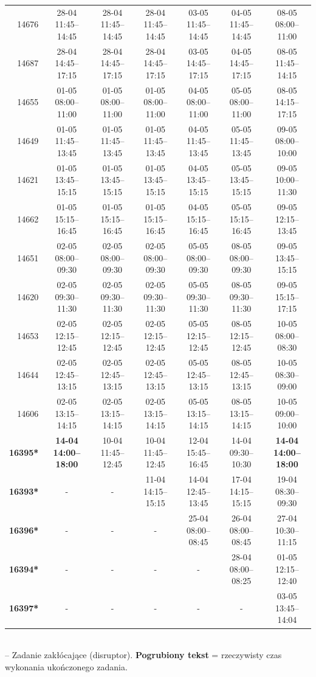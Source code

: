 \begin{table}[htbp]
\begin{tabular}{|r|c|c|c|c|c|c|}
14676 & 28-04 11:45--14:45 & 28-04 11:45--14:45 & 28-04 11:45--14:45 & 03-05 11:45--14:45 & 04-05 11:45--14:45 & 08-05 08:00--11:00 \\ 
14687 & 28-04 14:45--17:15 & 28-04 14:45--17:15 & 28-04 14:45--17:15 & 03-05 14:45--17:15 & 04-05 14:45--17:15 & 08-05 11:45--14:15 \\ 
14655 & 01-05 08:00--11:00 & 01-05 08:00--11:00 & 01-05 08:00--11:00 & 04-05 08:00--11:00 & 05-05 08:00--11:00 & 08-05 14:15--17:15 \\ 
14649 & 01-05 11:45--13:45 & 01-05 11:45--13:45 & 01-05 11:45--13:45 & 04-05 11:45--13:45 & 05-05 11:45--13:45 & 09-05 08:00--10:00 \\ 
14621 & 01-05 13:45--15:15 & 01-05 13:45--15:15 & 01-05 13:45--15:15 & 04-05 13:45--15:15 & 05-05 13:45--15:15 & 09-05 10:00--11:30 \\ 
14662 & 01-05 15:15--16:45 & 01-05 15:15--16:45 & 01-05 15:15--16:45 & 04-05 15:15--16:45 & 05-05 15:15--16:45 & 09-05 12:15--13:45 \\ 
14651 & 02-05 08:00--09:30 & 02-05 08:00--09:30 & 02-05 08:00--09:30 & 05-05 08:00--09:30 & 08-05 08:00--09:30 & 09-05 13:45--15:15 \\ 
14620 & 02-05 09:30--11:30 & 02-05 09:30--11:30 & 02-05 09:30--11:30 & 05-05 09:30--11:30 & 08-05 09:30--11:30 & 09-05 15:15--17:15 \\ 
14653 & 02-05 12:15--12:45 & 02-05 12:15--12:45 & 02-05 12:15--12:45 & 05-05 12:15--12:45 & 08-05 12:15--12:45 & 10-05 08:00--08:30 \\ 
14644 & 02-05 12:45--13:15 & 02-05 12:45--13:15 & 02-05 12:45--13:15 & 05-05 12:45--13:15 & 08-05 12:45--13:15 & 10-05 08:30--09:00 \\ 
14606 & 02-05 13:15--14:15 & 02-05 13:15--14:15 & 02-05 13:15--14:15 & 05-05 13:15--14:15 & 08-05 13:15--14:15 & 10-05 09:00--10:00 \\ 
\hline
\textbf{16395*} & \textbf{14-04 14:00--18:00} & 10-04 11:45--12:45 & 10-04 11:45--12:45 & 12-04 15:45--16:45 & 14-04 09:30--10:30 & \textbf{14-04 14:00--18:00} \\ 
\textbf{16393*} & - & - & 11-04 14:15--15:15 & 14-04 12:45--13:45 & 17-04 14:15--15:15 & 19-04 08:30--09:30 \\ 
\textbf{16396*} & - & - & - & 25-04 08:00--08:45 & 26-04 08:00--08:45 & 27-04 10:30--11:15 \\ 
\textbf{16394*} & - & - & - & - & 28-04 08:00--08:25 & 01-05 12:15--12:40 \\ 
\textbf{16397*} & - & - & - & - & - & 03-05 13:45--14:04 \\ 
\hline
\end{tabular}
\\ {\tiny * -- Zadanie zakłócające (disruptor). \textbf{Pogrubiony tekst} = rzeczywisty czas wykonania ukończonego zadania.}
\end{table}

\vspace{0.8cm}
